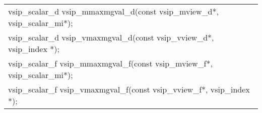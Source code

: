 \\\cvsiplh
\afh
{
\ttfamily
\\\hspace*{.04\textwidth}\begin{tabular}[H]{l}
vsip\_scalar\_d vsip\_mmaxmgval\_d(const vsip\_mview\_d*, vsip\_scalar\_mi*);\\
vsip\_scalar\_d vsip\_vmaxmgval\_d(const vsip\_vview\_d*, vsip\_index *);\\
vsip\_scalar\_f vsip\_mmaxmgval\_f(const vsip\_mview\_f*, vsip\_scalar\_mi*);\\
vsip\_scalar\_f vsip\_vmaxmgval\_f(const vsip\_vview\_f*, vsip\_index *);\\
\end{tabular}
}
\\\pyjvsiph
%
%
%
